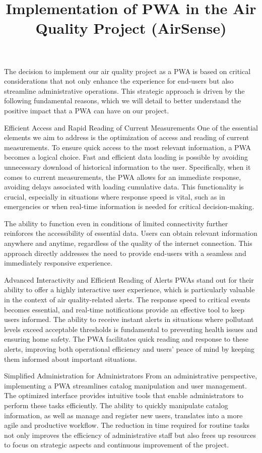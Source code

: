 \documentclass[english,10pt,a4paper]{article}
\title{
	Implementation of PWA in the Air Quality Project (AirSense)}
\begin{document}
	\maketitle
	
	The decision to implement our air quality project as a PWA is based on critical considerations that not only enhance the experience for end-users but also streamline administrative operations. This strategic approach is driven by the following fundamental reasons, which we will detail to better understand the positive impact that a PWA can have on our project.
	
	Efficient Access and Rapid Reading of Current Measurements
	One of the essential elements we aim to address is the optimization of access and reading of current measurements. To ensure quick access to the most relevant information, a PWA becomes a logical choice. Fast and efficient data loading is possible by avoiding unnecessary download of historical information to the user. Specifically, when it comes to current measurements, the PWA allows for an immediate response, avoiding delays associated with loading cumulative data. This functionality is crucial, especially in situations where response speed is vital, such as in emergencies or when real-time information is needed for critical decision-making.
	
	The ability to function even in conditions of limited connectivity further reinforces the accessibility of essential data. Users can obtain relevant information anywhere and anytime, regardless of the quality of the internet connection. This approach directly addresses the need to provide end-users with a seamless and immediately responsive experience.
	
	Advanced Interactivity and Efficient Reading of Alerts
	PWAs stand out for their ability to offer a highly interactive user experience, which is particularly valuable in the context of air quality-related alerts. The response speed to critical events becomes essential, and real-time notifications provide an effective tool to keep users informed. The ability to receive instant alerts in situations where pollutant levels exceed acceptable thresholds is fundamental to preventing health issues and ensuring home safety. The PWA facilitates quick reading and response to these alerts, improving both operational efficiency and users' peace of mind by keeping them informed about important situations.
	
	Simplified Administration for Administrators
	From an administrative perspective, implementing a PWA streamlines catalog manipulation and user management. The optimized interface provides intuitive tools that enable administrators to perform these tasks efficiently. The ability to quickly manipulate catalog information, as well as manage and register new users, translates into a more agile and productive workflow. The reduction in time required for routine tasks not only improves the efficiency of administrative staff but also frees up resources to focus on strategic aspects and continuous improvement of the project.
	
\end{document}
